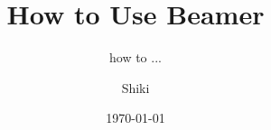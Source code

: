 \documentclass[20pt, fontset=none]{beamer}
\title{How to Use Beamer}
\subtitle{how to ...}
\author{Shiki \inst{1}}
\institute{\inst{1} xxxx}
\date{\today}
\begin{document}
  \begin{sloppypar}
  
  
  
  
  
  
  \end{sloppypar}
\end{document}
